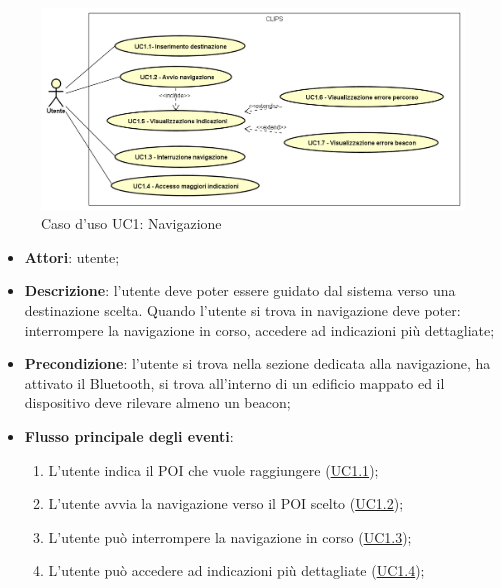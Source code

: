 \documentclass[../AnalisiDeiRequisiti.tex]{subfiles}
\begin{document}
\begin{figure}[H]
	\centering
	\includegraphics[scale=0.95, width=\textwidth]{img/UC1.png}
	\caption{Caso d'uso UC1: Navigazione}\label{fig:UC1} 
\end{figure}
\begin{itemize}
	\item \textbf{Attori}: utente;
	\item \textbf{Descrizione}: l'utente deve poter essere guidato dal sistema verso una destinazione scelta. Quando l'utente si trova in navigazione deve poter: interrompere la navigazione in corso, accedere ad indicazioni più dettagliate; 
	\item \textbf{Precondizione}: l'utente si trova nella sezione dedicata alla navigazione, ha attivato il Bluetooth, si trova all'interno di un edificio mappato ed il dispositivo deve rilevare almeno un beacon;
	
	\item \textbf{Flusso principale degli eventi}:
	\begin{enumerate}
		\item L'utente indica il POI che vuole raggiungere (\hyperlink{UC1.1}{UC1.1});
		\item L'utente avvia la navigazione verso il POI scelto (\hyperlink{UC1.2}{UC1.2});
		\item L'utente può interrompere la navigazione in corso  (\hyperlink{UC1.3}{UC1.3});
		\item L'utente può accedere ad indicazioni più dettagliate  (\hyperlink{UC1.4}{UC1.4});
		

\end{enumerate}
\end{itemize}
\end{document}
